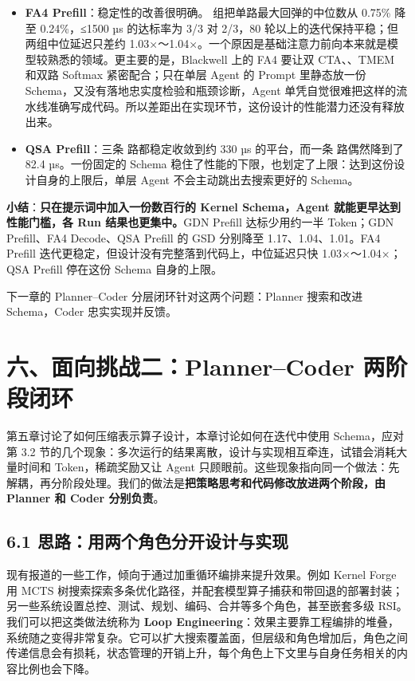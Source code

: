 \begin{enumerate}[start=1]
\begin{itemize}
\item
\textbf{FA4 Prefill}：稳定性的改善很明确。 组把单路最大回弹的中位数从 0.75\% 降至 0.24\%，≤1500 µs 的达标率为 3/3 对 2/3，80 轮以上的迭代保持平稳；但两组中位延迟只差约 1.03×～1.04×。一个原因是基础注意力前向本来就是模型较熟悉的领域。更主要的是，Blackwell 上的 FA4 要让双 CTA、、TMEM 和双路 Softmax 紧密配合；只在单层 Agent 的 Prompt 里静态放一份 Schema，又没有落地忠实度检验和瓶颈诊断，Agent 单凭自觉很难把这样的流水线准确写成代码。所以差距出在实现环节，这份设计的性能潜力还没有释放出来。


\item
\textbf{QSA Prefill}：三条  路都稳定收敛到约 330 µs 的平台，而一条  路偶然降到了 82.4 µs。一份固定的 Schema 稳住了性能的下限，也划定了上限：达到这份设计自身的上限后，单层 Agent 不会主动跳出去搜索更好的 Schema。


\end{itemize}
\end{enumerate}

\begin{ReportQuote}
\textbf{小结}：\textbf{只在提示词中加入一份数百行的 Kernel Schema，Agent 就能更早达到性能门槛，各 Run 结果也更集中。}GDN Prefill 达标少用约一半 Token；GDN Prefill、FA4 Decode、QSA Prefill 的 GSD 分别降至 1.17、1.04、1.01。FA4 Prefill 迭代更稳定，但设计没有完整落到代码上，中位延迟只快 1.03×～1.04×；QSA Prefill 停在这份 Schema 自身的上限。

下一章的 Planner–Coder 分层闭环针对这两个问题：Planner 搜索和改进 Schema，Coder 忠实实现并反馈。


\end{ReportQuote}
\SourceSeparator
\clearpage


\section{六、面向挑战二：Planner–Coder 两阶段闭环}
第五章讨论了如何压缩表示算子设计，本章讨论如何在迭代中使用 Schema，应对第 3.2 节的几个现象：多次运行的结果离散，设计与实现相互牵连，试错会消耗大量时间和 Token，稀疏奖励又让 Agent 只顾眼前。这些现象指向同一个做法：先解耦，再分阶段处理。我们的做法是\textbf{把策略思考和代码修改放进两个阶段，由 Planner 和 Coder 分别负责}。


\SourceSeparator
\subsection{6.1 思路：用两个角色分开设计与实现}
现有报道的一些工作，倾向于通过加重循环编排来提升效果。例如 Kernel Forge 用 MCTS 树搜索探索多条优化路径，并配套模型算子捕获和带回退的部署封装；另一些系统设置总控、测试、规划、编码、合并等多个角色，甚至嵌套多级 RSI。我们可以把这类做法统称为 \textbf{Loop Engineering}：效果主要靠工程编排的堆叠，系统随之变得非常复杂。它可以扩大搜索覆盖面，但层级和角色增加后，角色之间传递信息会有损耗，状态管理的开销上升，每个角色上下文里与自身任务相关的内容比例也会下降。


